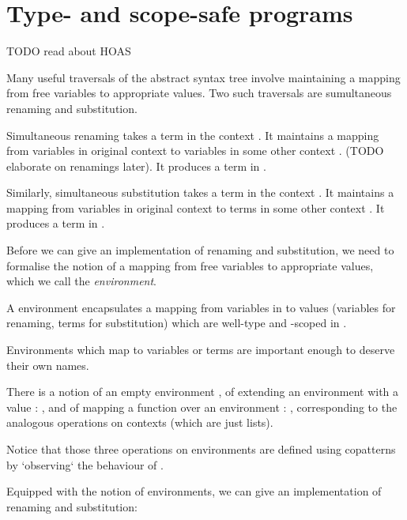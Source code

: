 \documentclass[bsc,frontabs,twoside,singlespacing,parskip,deptreport]{infthesis}
\theoremstyle{definition}
\begin{document}
\section{Type- and scope-safe programs}

TODO read about HOAS

Many useful traversals of the abstract syntax tree involve maintaining
a mapping from free variables to appropriate values. Two such
traversals are sumultaneous renaming and substitution.

Simultaneous renaming takes a term in the context . It maintains
a mapping from variables in original context  to variables in
some other context . (TODO elaborate on renamings later). It
produces a term in .

Similarly, simultaneous substitution takes a term in the context
. It maintains a mapping from variables in original context
 to terms in some other context . It produces a term in
.

Before we can give an implementation of renaming and substitution, we
need to formalise the notion of a mapping from free variables to
appropriate values, which we call the \textit{environment}.


A environment  encapsulates a mapping from variables in
 to values  (variables for renaming, terms for
substitution) which are well-type and -scoped in .

Environments which map to variables or terms are important enough to
deserve their own names.


There is a notion of an empty environment , of extending an
environment  with a value : , and of mapping a
function  over an environment : ,
corresponding to the analogous operations on contexts (which are just
lists).


Notice that those three operations on environments are defined using
copatterns \cite{DBLP:conf/popl/AbelPTS13} by `observing` the
behaviour of .

Equipped with the notion of environments, we can give an
implementation of renaming and substitution:

\end{document}
